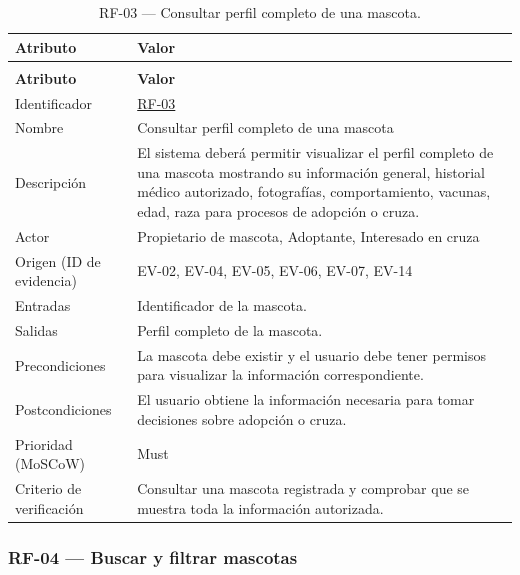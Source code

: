 \documentclass[journal,onecolumn]{IEEEtran}
\makeatletter
\newenvironment{atributos}[2]{%
	\small
	\begin{longtable}{@{}>{\raggedright\arraybackslash}p{4.2cm} >{\raggedright\arraybackslash}p{11.2cm}@{}}
		\caption{#2}\label{tab:#1}\\
		\toprule
		\textbf{Atributo} & \textbf{Valor} \\
		\midrule
		\endfirsthead
		\multicolumn{2}{@{}l}{\small\itshape (continuación)}\\
		\toprule
		\textbf{Atributo} & \textbf{Valor} \\
		\midrule
		\endhead
		\bottomrule
		\endlastfoot
	}{%
	\end{longtable}
	\normalsize
}
\makeatother
\begin{document}
	\begin{atributos}{RF-03}{RF-03 --- Consultar perfil completo de una mascota.}
		Identificador & \hyperref[tab:RF-03]{RF-03} \\
		Nombre & Consultar perfil completo de una mascota \\
		Descripción & El sistema deberá permitir visualizar el perfil completo de una mascota mostrando su información general, historial médico autorizado, fotografías, comportamiento, vacunas, edad, raza para procesos de adopción o cruza. \\
		Actor & Propietario de mascota, Adoptante, Interesado en cruza \\
		Origen (ID de evidencia) & EV-02, EV-04, EV-05, EV-06, EV-07, EV-14 \\
		Entradas & Identificador de la mascota. \\
		Salidas & Perfil completo de la mascota. \\
		Precondiciones & La mascota debe existir y el usuario debe tener permisos para visualizar la información correspondiente. \\
		Postcondiciones & El usuario obtiene la información necesaria para tomar decisiones sobre adopción o cruza. \\
		Prioridad (MoSCoW) & Must \\
		Criterio de verificación & Consultar una mascota registrada y comprobar que se muestra toda la información autorizada. \\
	\end{atributos}
	
	\subsubsection{RF-04 --- Buscar y filtrar mascotas}
	
\end{document}
